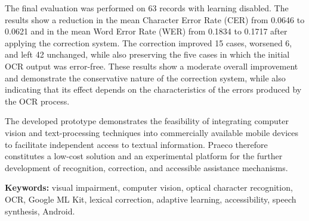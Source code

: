 The final evaluation was performed on 63 records with learning disabled. The results show a reduction in the mean Character Error Rate (CER) from 0.0646 to 0.0621 and in the mean Word Error Rate (WER) from 0.1834 to 0.1717 after applying the correction system. The correction improved 15 cases, worsened 6, and left 42 unchanged, while also preserving the five cases in which the initial OCR output was error-free. These results show a moderate overall improvement and demonstrate the conservative nature of the correction system, while also indicating that its effect depends on the characteristics of the errors produced by the OCR process.

The developed prototype demonstrates the feasibility of integrating computer vision and text-processing techniques into commercially available mobile devices to facilitate independent access to textual information. Praeco therefore constitutes a low-cost solution and an experimental platform for the further development of recognition, correction, and accessible assistance mechanisms.

\textbf{Keywords:} visual impairment, computer vision, optical character recognition, OCR, Google ML Kit, lexical correction, adaptive learning, accessibility, speech synthesis, Android.